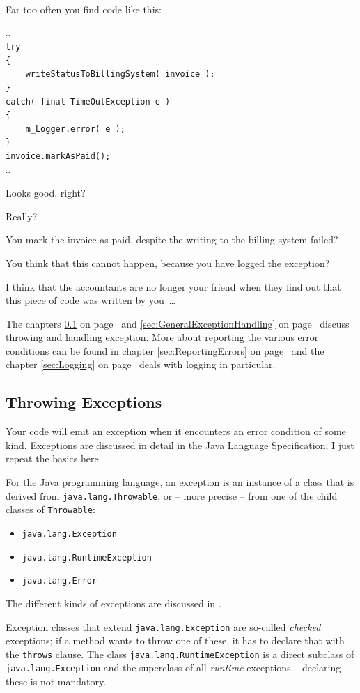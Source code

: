 \documentclass[11pt,a4paper, titlepage, parskip=half, headsepline, footsepline, cleardoublepage=current, headheight=1cm]{scrbook}
\newcommand*{\tqvref}[1]{\hyperref[{#1}]{\ref*{#1}} on page~\pageref{#1}}
\begin{document}
Far too often you find code like this:
\begin{lstlisting}
…
try
{
    writeStatusToBillingSystem( invoice );
}
catch( final TimeOutException e )
{
    m_Logger.error( e );
}
invoice.markAsPaid();
…
\end{lstlisting}

Looks good, right?

Really?

You mark the invoice as paid, despite the writing to the billing system failed?

You think that this cannot happen, because you have logged the exception?

I think that the accountants are no longer your friend when they find out that this piece of code was written by you~…

The chapters \tqvref{sec:ThrowingExceptions} and \tqvref{sec:GeneralExceptionHandling} discuss throwing and handling exception. More about reporting the various error conditions can be found in chapter \tqvref{sec:ReportingErrors} and the chapter \tqvref{sec:Logging} deals with logging in particular.

\subsection{Throwing Exceptions}\label{sec:ThrowingExceptions}
Your code will emit an exception when it encounters an error condition of some kind. Exceptions are discussed in detail in the Java Language Specification\autocite{ORACLE_DOC_LANGUAGE_SPECIFICATION:Exceptions}; I just repeat the basics here.

For the Java programming language, an exception is an instance of a class that is derived from \lstinline|java.lang.Throwable|\autocite{ORACLE_DOC_THROWABLE_CLASS}, or – more precise – from one of the child classes of \lstinline|Throwable|:
\begin{itemize}[nosep]
\item{\lstinline|java.lang.Exception|\autocite{ORACLE_DOC_EXCEPTION_CLASS}}
\item{\lstinline|java.lang.RuntimeException|\autocite{ORACLE_DOC_RUNTIMEEXCEPTION_CLASS}}
\item{\lstinline|java.lang.Error|\autocite{ORACLE_DOC_ERROR_CLASS}}
\end{itemize}

The different kinds of exceptions are discussed in \autocite{ORACLE_DOC_LANGUAGE_SPECIFICATION:KindsOfExceptions}.

Exception classes that extend \lstinline|java.lang.Exception| are so-called \textit{checked} exceptions; if a method wants to throw one of these, it has to declare that with the \lstinline|throws| clause. The class \lstinline|java.lang.RuntimeException| is a direct subclass of \lstinline|java.lang.Exception| and the superclass of all \textit{runtime} exceptions – declaring these is not mandatory.
\end{document}
